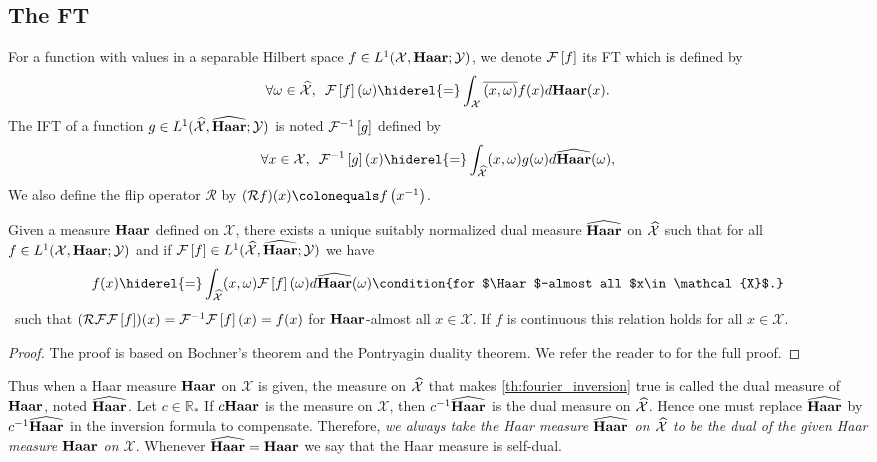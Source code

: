 \subsection{The \acl{FT}}
For a function with values in a separable Hilbert space $f\in L^1(\mathcal{X},\mathbf{Haar};\mathcal{Y})$, we denote $\mathcal{F}\left[f\right]$ its \acf{FT} which is defined by
\begin{dmath*}
    \forall \omega \in \dual{\mathcal{X}},\enskip \FT{f}(\omega) \hiderel{=}\int_{\mathcal{X}} \conj{\pairing{x,\omega}}f(x)d\Haar(x).
\end{dmath*}
The \acf{IFT} of a function $g\in L^1(\widehat{\mathcal{X}},\widehat{\mathbf{Haar}}; \mathcal{Y})$ is noted $\mathcal{F}^{-1}\left[g\right]$ defined by
\begin{dmath*}
    \forall x \in \mathcal{X},\enskip \IFT{g}(x) \hiderel{=} \int_{\dual{\mathcal{X}}} \pairing{x,\omega}g(\omega) d\dual{\Haar}(\omega),
\end{dmath*}
We also define the flip operator $\mathcal{R}$ by $(\mathcal{R}f)(x) \colonequals f\left(\inv{x}\right)$.
\begin{theorem}
\label{th:fourier_inversion}
Given a measure $\Haar$ defined on $\mathcal{X}$, there exists a unique suitably normalized dual measure $\widehat{\mathbf{Haar}}$ on $\widehat{\mathcal{X}}$ such that for all $f \in L^1(\mathcal{X}, \mathbf{Haar};\mathcal{Y})$ and if $\mathcal{F}\left[f\right] \in L^1(\widehat{\mathcal{X}}, \widehat{\mathbf{Haar}}; \mathcal{Y})$ we have
\begin{dmath}
\label{fourier-l1}
f(x)\hiderel{=}\int_{\dual{\mathcal{X}}}\pairing{x,\omega}\FT{f}(\omega) d\dual{\Haar}(\omega) \condition{for $\Haar$-almost all $x\in \mathcal{X}$.}
\end{dmath}
\ie~such that $(\mathcal{R}\mathcal{F}\mathcal{F}\left[f\right])(x)=\mathcal{F}^{-1}\mathcal{F}\left[f\right](x)=f(x)$ for $\Haar$-almost all $x\in\mathcal{X}$. If $f$ is continuous this relation holds for all $x\in\mathcal{X}$.
\end{theorem}
\begin{proof}
The proof is based on Bochner's theorem and the Pontryagin duality theorem. We refer the reader to \citet[theorem~4.22 page~105 and theorem~4.33 page~111]{folland1994course} for the full proof.
\end{proof}
Thus when a Haar measure $\Haar$ on $\mathcal{X}$ is given, the measure on $\widehat{\mathcal{X}}$ that makes \cref{th:fourier_inversion} true is called the dual measure of $\Haar$, noted $\widehat{\mathbf{Haar}}$. Let $c\in\mathbb{R}_*$ If $c\mathbf{Haar}$ is the measure on $\mathcal{X}$, then $c^{-1}\widehat{\mathbf{Haar}}$ is the dual measure on $\widehat{\mathcal{X}}$. Hence one must replace $\widehat{\mathbf{Haar}}$ by $c^{-1}\widehat{\mathbf{Haar}}$ in the inversion formula to compensate. Therefore, \emph{we always take the Haar measure $\widehat{\mathbf{Haar}}$ on $\widehat{\mathcal{X}}$ to be the dual of the given Haar measure $\Haar$ on $\mathcal{X}$}. Whenever $\widehat{\mathbf{Haar}}=\mathbf{Haar}$ we say that the Haar measure is self-dual.

